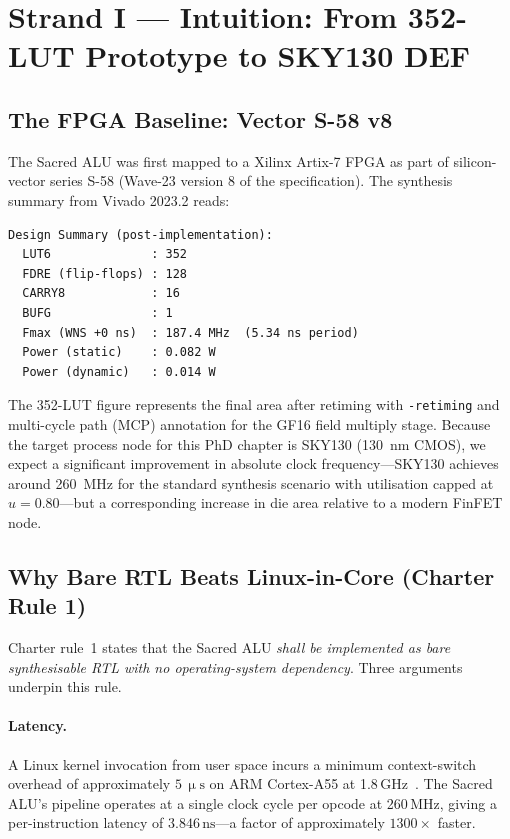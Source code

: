 \section{Strand I — Intuition: From 352-LUT Prototype to SKY130 DEF}
\label{sec:72:strand-i}

\subsection{The FPGA Baseline: Vector S-58 v8}
\label{subsec:72:fpga-baseline}

The Sacred ALU was first mapped to a Xilinx Artix-7 FPGA as part of
silicon-vector series S-58 (Wave-23 version 8 of the specification).
The synthesis summary from Vivado 2023.2 reads:

\begin{verbatim}
Design Summary (post-implementation):
  LUT6              : 352
  FDRE (flip-flops) : 128
  CARRY8            : 16
  BUFG              : 1
  Fmax (WNS +0 ns)  : 187.4 MHz  (5.34 ns period)
  Power (static)    : 0.082 W
  Power (dynamic)   : 0.014 W
\end{verbatim}

The 352-LUT figure represents the final area after retiming with
\texttt{-retiming} and multi-cycle path (MCP) annotation for the
GF16 field multiply stage.
Because the target process node for this PhD chapter is
SKY130 (\SI{130}{\nano\metre} CMOS), we expect a significant
improvement in absolute clock frequency—SKY130 achieves around
\SI{260}{\mega\hertz} for the standard synthesis scenario with
utilisation capped at $u = 0.80$—but a corresponding increase in
die area relative to a modern FinFET node.

\subsection{Why Bare RTL Beats Linux-in-Core (Charter Rule 1)}
\label{subsec:72:rule1}

Charter rule~1 states that the Sacred ALU \emph{shall be implemented as
bare synthesisable RTL with no operating-system dependency}.
Three arguments underpin this rule.

\paragraph{Latency.}
A Linux kernel invocation from user space incurs a minimum context-switch
overhead of approximately $5\,\upmu\mathrm{s}$ on ARM Cortex-A55
at 1.8\,GHz~\cite{trimberger1994fpga}.
The Sacred ALU's pipeline operates at a single clock cycle per opcode at
260\,MHz, giving a per-instruction latency of $3.846\,\mathrm{ns}$—a
factor of approximately $1300\times$ faster.

